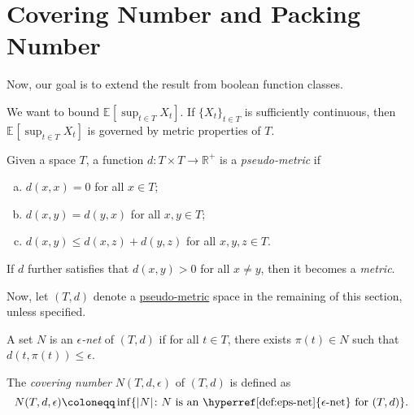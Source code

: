 \section{Covering Number and Packing Number}
Now, our goal is to extend the result from boolean function classes.

\begin{intuition}
  We want to bound \(\mathbb{E}_{}\left[\sup _{t\in T } X_t \right]\). If \(\{ X_t \} _{t\in T}\) is sufficiently continuous, then \(\mathbb{E}_{}\left[\sup _{t\in T} X_t\right] \) is governed by metric properties of \(T\).
\end{intuition}

\begin{definition}\label{def:pseudo-metric}
  Given a space \(T\), a function \(d\colon T \times T \to \mathbb{R} ^+\) is a \emph{pseudo-metric} if
  \begin{enumerate}[(a)]
    \item \(d(x, x) = 0\) for all \(x \in T\);
    \item \(d(x, y) = d(y, x)\) for all \(x, y\in T\);
    \item \(d(x, y) \leq d(x, z) + d(y, z)\) for all \(x, y, z\in T\).
  \end{enumerate}
\end{definition}

\begin{note}
  If \(d\) further satisfies that \(d(x, y) > 0\) for all \(x \neq y\), then it becomes a \emph{metric}.
\end{note}

Now, let \((T, d)\) denote a \hyperref[def:pseudo-metric]{pseudo-metric} space in the remaining of this section, unless specified.

\begin{definition}\label{def:eps-net}
  A set \(N\) is an \emph{\(\epsilon \)-net} of \((T, d)\) if for all \(t\in T\), there exists \(\pi (t) \in N\) such that \(d(t, \pi (t)) \leq \epsilon \).
\end{definition}

\begin{definition}\label{def:covering-number}
  The \emph{covering number} \(N(T, d, \epsilon )\) of \((T, d)\) is defined as
  \[
    N(T, d, \epsilon ) \coloneqq \inf \{ \vert N \vert \colon N \text{ is an \hyperref[def:eps-net]{\(\epsilon\)-net} for \((T, d)\)} \}.
  \]
\end{definition}

